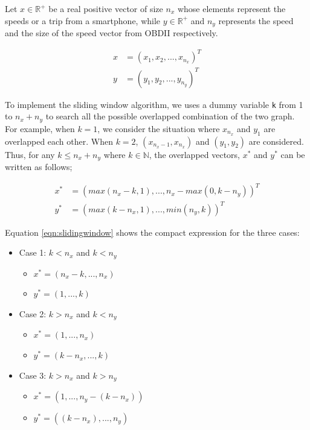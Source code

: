 \documentclass[letterpaper,9pt,twocolumn,twoside,]{pinp}
\providecommand{\tightlist}{%
  \setlength{\itemsep}{0pt}\setlength{\parskip}{0pt}}
\begin{document}
Let \(x \in \mathbb{R^{+}}\) be a real positive vector of size \(n_x\)
whose elements represent the speeds or a trip from a smartphone, while
\(y \in \mathbb{R^{+}}\) and \(n_y\) represents the speed and the size
of the speed vector from OBDII respectively.

\begin{equation*}
  \begin{aligned}
    x & = (x_1, x_2, ..., x_{n_x})^T \\
    y & = (y_1, y_2, ..., y_{n_y})^T
  \label{eqn:speedvector} 
  \end{aligned}
\end{equation*}

To implement the sliding window algorithm, we uses a dummy variable
\texttt{k} from 1 to \(n_x + n_y\) to search all the possible overlapped
combination of the two graph. For example, when \(k = 1\), we consider
the situation where \(x_{n_x}\) and \(y_1\) are overlapped each other.
When \(k=2\), \((x_{n_x - 1}, x_{n_x})\) and \((y_1, y_2)\) are
considered. Thus, for any \(k \leq n_x+n_y\) where \(k \in \mathbb{N}\),
the overlapped vectors, \(x^*\) and \(y^*\) can be written as follows;

\begin{equation}
  \begin{aligned}
  x^* &= (max(n_x - k, 1), ..., n_x - max(0, k - n_y))^T \\
  y^* &= (max(k-n_x, 1), ..., min(n_y, k))^T
  \label{eqn:slidingwindow} 
  \end{aligned}
\end{equation}

Equation \ref{eqn:slidingwindow} shows the compact expression for the
three cases:

\begin{itemize}
\tightlist
\item
  Case 1: \(k < n_x\) and \(k < n_y\)

  \begin{itemize}
  \tightlist
  \item
    \(x^* = (n_x - k, ..., n_x)\)
  \item
    \(y^* = (1, ..., k)\)
  \end{itemize}
\item
  Case 2: \(k > n_x\) and \(k < n_y\)

  \begin{itemize}
  \tightlist
  \item
    \(x^* = (1, ..., n_x)\)
  \item
    \(y^* = (k-n_x, ..., k)\)
  \end{itemize}
\item
  Case 3: \(k > n_x\) and \(k > n_y\)

  \begin{itemize}
  \tightlist
  \item
    \(x^* = (1, ..., n_y - (k-n_x))\)
  \item
    \(y^* = ((k-n_x), ..., n_y)\)
  \end{itemize}
\end{itemize}
\end{document}
